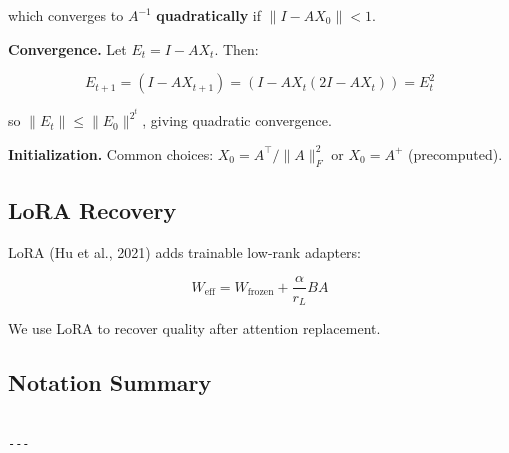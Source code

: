 which converges to $A^{-1}$ \textbf{quadratically} if $\|I - A X_0\| < 1$.

\textbf{Convergence.} Let $E_t = I - A X_t$. Then:

\[
E_{t+1} = (I - A X_{t+1}) = (I - A X_t (2I - A X_t)) = E_t^2
\]

so $\|E_t\| \le \|E_0\|^{2^t}$, giving quadratic convergence.

\textbf{Initialization.} Common choices: $X_0 = A^\top / \|A\|_F^2$ or $X_0 = A^+$ 
(precomputed).

\subsection{LoRA Recovery}

LoRA (Hu et al., 2021) adds trainable low-rank adapters:

\[
W_\text{eff} = W_\text{frozen} + \frac{\alpha}{r_L} B A
\]

We use LoRA to recover quality after attention replacement.

\subsection{Notation Summary}

\begin{lstlisting}

---
\end{lstlisting}